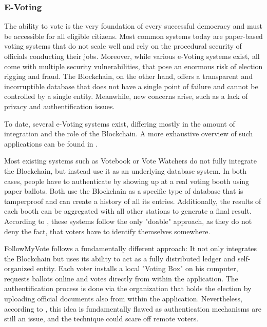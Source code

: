 \subsubsection{E-Voting}
\label{subsec:03_applications_evoting}
The ability to vote is the very foundation of every successful democracy and must be accessible for all eligible citizens. Most common systems today are paper-based voting systems that do not scale well and rely on the procedural security of officials conducting their jobs. Moreover, while various e-Voting systems exist, all come with multiple security vulnerabilities, that pose an enormous risk of election rigging and fraud.
The Blockchain, on the other hand, offers a transparent and incorruptible database that does not have a single point of failure and cannot be controlled by a single entity. Meanwhile, new concerns arise, such as a lack of privacy and authentification issues.

To date, several e-Voting systems exist, differing mostly in the amount of integration and the role of the Blockchain. A more exhaustive overview of such applications can be found in \cite{BenAyed2017}.

Most existing systems such as Votebook \cite{Kirby2016} or Vote Watchers \cite{BlockchainTechnologiesCorporation} do not fully integrate the Blockchain, but instead use it as an underlying database system. In both cases, people have to authenticate by showing up at a real voting booth using paper ballots. Both use the Blockchain as a specific type of database that is tamperproof and can create a history of all its entries. Additionally, the results of each booth can be aggregated with all other stations to generate a final result\cite{BenAyed2017}.
According to \cite{Osgood2016}, these systems follow the only "doable" approach, as they do not deny the fact, that voters have to identify themselves somewhere.

FollowMyVote \cite{FollowMyVote} follows a fundamentally different approach: It not only integrates the Blockchain but uses its ability to act as a fully distributed ledger and self-organized entity. Each voter installs a local "Voting Box" on his computer, requests ballots online and votes directly from within the application. The authentification process is done via the organization that holds the election by uploading official documents also from within the application. Nevertheless, according to \cite{Osgood2016}, this idea is fundamentally flawed as authentication mechanisms are still an issue, and the technique could scare off remote voters.

